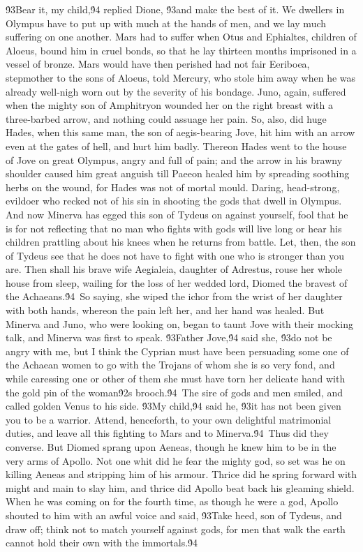 {\'93Bear it, my child,\'94 replied Dione, \'93and make the best of it. We dwellers in Olympus have to put up with much at the hands of men, and we lay much suffering on one another. Mars had to suffer when Otus and Ephialtes, children of Aloeus, bound him in cruel bonds, so that he lay thirteen months imprisoned in a vessel of bronze. Mars would have then perished had not fair Eeriboea, stepmother to the sons of Aloeus, told Mercury, who stole him away when he was already well-nigh worn out by the severity of his bondage. Juno, again, suffered when the mighty son of Amphitryon wounded her on the right breast with a three-barbed arrow, and nothing could assuage her pain. So, also, did huge Hades, when this same man, the son of aegis-bearing Jove, hit him with an arrow even at the gates of hell, and hurt him badly. Thereon Hades went to the house of Jove on great Olympus, angry and full of pain; and the arrow in his brawny shoulder caused him great anguish till Paeeon healed him by spreading soothing herbs on the wound, for Hades was not of mortal mould. Daring, head-strong, evildoer who recked not of his sin in shooting the gods that dwell in Olympus. And now Minerva has egged this son of Tydeus on against yourself, fool that he is for not reflecting that no man who fights with gods will live long or hear his children prattling about his knees when he returns from battle. Let, then, the son of Tydeus see that he does not have to fight with one who is stronger than you are. Then shall his brave wife Aegialeia, daughter of Adrestus, rouse her whole house from sleep, wailing for the loss of her wedded lord, Diomed the bravest of the Achaeans.\'94\
So saying, she wiped the ichor from the wrist of her daughter with both hands, whereon the pain left her, and her hand was healed. But Minerva and Juno, who were looking on, began to taunt Jove with their mocking talk, and Minerva was first to speak. \'93Father Jove,\'94 said she, \'93do not be angry with me, but I think the Cyprian must have been persuading some one of the Achaean women to go with the Trojans of whom she is so very fond, and while caressing one or other of them she must have torn her delicate hand with the gold pin of the woman\'92s brooch.\'94\
The sire of gods and men smiled, and called golden Venus to his side. \'93My child,\'94 said he, \'93it has not been given you to be a warrior. Attend, henceforth, to your own delightful matrimonial duties, and leave all this fighting to Mars and to Minerva.\'94\
Thus did they converse. But Diomed sprang upon Aeneas, though he knew him to be in the very arms of Apollo. Not one whit did he fear the mighty god, so set was he on killing Aeneas and stripping him of his armour. Thrice did he spring forward with might and main to slay him, and thrice did Apollo beat back his gleaming shield. When he was coming on for the fourth time, as though he were a god, Apollo shouted to him with an awful voice and said, \'93Take heed, son of Tydeus, and draw off; think not to match yourself against gods, for men that walk the earth cannot hold their own with the immortals.\'94\
}
